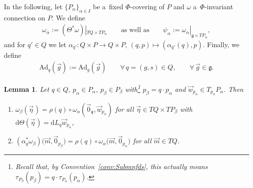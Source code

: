 \documentclass[11pt]{article}
\numberwithin{equation}{section}
\newtheorem{Lemma}[Theorem]{Lemma}
\newcommand{\Co}[1]{\alpha_{#1}}
\newcommand{\Add}[1]{\mathrm{Ad}_{#1}}
\begin{document}
In the following, let $\{P_\alpha\}_{\alpha\in I}$ be a~f\/ixed $\Phi$-covering of $P$ and $\omega$ a~$\Phi$-invariant
connection on $P$.
We def\/ine
\begin{gather*}
\omega_\alpha:=(\Theta^{*}\omega)|_{TQ\times TP_\alpha}\qquad\text{as well as}\qquad\psi_\alpha:=\omega_\alpha|_{\mathfrak{g}\times
TP_\alpha},
\end{gather*}
and for $q'\in Q$ we let $\Co{q'}\colon Q\times P\rightarrow Q\times P$, $(q,p)\mapsto \left(\Co{q'}(q),p\right)$. Finally, we define
\begin{gather*}
\Add{q}(\vec{g}):=\Add{g}(\vec{g})\qquad\forall\, q=(g,s)\in Q,\qquad \forall\, \vec{g}\in \mathfrak{g}.
\end{gather*}
\begin{Lemma}
\label{lemma:omegaalpha}
Let $q\in Q$, $p_\alpha\in P_\alpha$, $p_\beta\in P_\beta$ with\footnote{Recall that, by Convention~\ref{conv:Submnfds}, this actually means $\tau_{P_\beta}(p_\beta)=q\cdot
\tau_{P_\alpha}(p_\alpha)$.} $p_\beta=q\cdot p_\alpha$ and $\vec{w}_{p_\alpha}\in
T_{p_\alpha}P_\alpha$.
Then
\begin{enumerate}\itemsep=0pt
\item[$1)$]
$\omega_\beta(\vec{\eta}\hspace{1pt})=\rho(q)\circ \omega_\alpha(\vec{0}_\mathfrak{q},\vec{w}_{p_\alpha})$ for all $\vec{\eta}\in
TQ\times TP_\beta$ with $\mathrm{d}\Theta(\vec{\eta}\hspace{1pt})=\mathrm{d} L_q\vec{w}_{p_\alpha}$,
\item[$2)$]
$\left(\Co{q}^{*}\omega_\beta\right)\big(\vec{m},\vec{0}_{p_\beta}\big)=\rho(q)\circ
\omega_\alpha\big(\vec{m},\vec{0}_{p_\alpha}\big)$ for all $\vec{m}\in TQ$.
\end{enumerate}
\end{Lemma}
\end{document}
